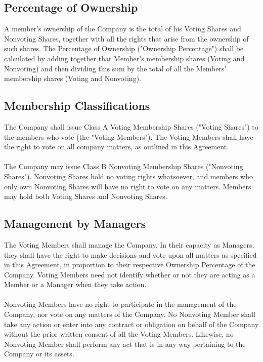 \documentclass[11pt]{article}
\begin{document}
\subsection{Percentage of Ownership}
A member's ownership of the Company is the total of his Voting Shares and Nonvoting Shares, together with all the rights that arise from the ownership of such shares. The Percentage of Ownership ("Ownership Percentage") shall be calculated by adding together that Member's membership shares (Voting and Nonvoting) and then dividing this sum by the total of all the Members' membership shares (Voting and Nonvoting).

\subsection{Membership Classifications}
The Company shall issue Class A Voting Membership Shares ("Voting Shares") to the members who vote (the "Voting Members"). The Voting Members shall have the right to vote on all company matters, as outlined in this Agreement.\\\\
The Company may issue Class B Nonvoting Membership Shares ("Nonvoting Shares"). Nonvoting Shares hold no voting rights whatsoever, and members who only own Nonvoting Shares will have no right to vote on any matters. Members may hold both Voting Shares and Nonvoting Shares.

\subsection{Management by Managers}
The Voting Members shall manage the Company. In their capacity as Managers, they shall have the right to make decisions and vote upon all matters as specified in this Agreement, in proportion to their respective Ownership Percentage of the Company. Voting Members need not identify whether or not they are acting as a Member or a Manager when they take action.\\\\
Nonvoting Members have no right to participate in the management of the Company, nor vote on any matters of the Company. No Nonvoting Member shall take any action or enter into any contract or obligation on behalf of the Company without the prior written consent of all the Voting Members. Likewise, no Nonvoting Member shall perform any act that is in any way pertaining to the Company or its assets.
\end{document}

